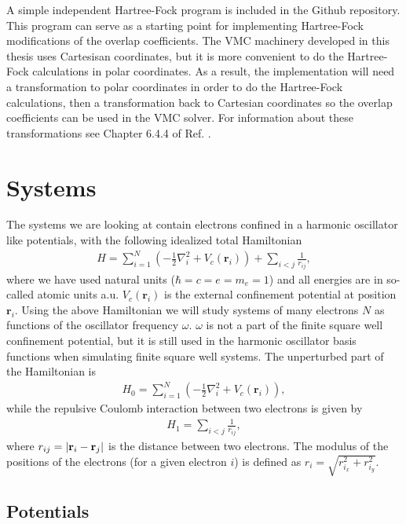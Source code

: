 \documentclass[../main.tex]{subfiles}
\begin{document}
A simple independent Hartree-Fock program is included in the Github repository\cite{github}. This program can serve as a starting point for implementing Hartree-Fock modifications of the overlap coefficients. The VMC machinery developed in this thesis uses Cartesisan coordinates, but it is more convenient to do the Hartree-Fock calculations in polar coordinates. As a result, the implementation will need a transformation to polar coordinates in order to do the Hartree-Fock calculations, then a transformation back to Cartesian coordinates so the overlap coefficients can be used in the VMC solver. For information about these transformations see Chapter 6.4.4 of Ref. \cite{Yang}.


\chapter{Systems}\label{sec: Systems}

The systems we are looking at contain electrons confined in a harmonic oscillator like potentials, with the following idealized total Hamiltonian
\begin{align}\label{eq: finalH}
    H=\sum_{i=1}^{N} \left(  -\frac{1}{2} \nabla_i^2 + V_c(\mathbf{r}_i)  \right)+\sum_{i<j}\frac{1}{r_{ij}},
\end{align}
where we have used natural units ($\hbar=c=e=m_e=1$) and all energies are in so-called atomic units a.u. $V_c(\mathbf{r}_i)$ is the external confinement potential at position $\mathbf{r}_i$. Using the above Hamiltonian we will study systems of many electrons $N$ as functions of the oscillator frequency  $\omega$. $\omega$ is not a part of the finite square well confinement potential, but it is still used in the harmonic oscillator basis functions when simulating finite square well systems. The unperturbed part of the Hamiltonian is
\begin{align}
    H_0=\sum_{i=1}^{N} \left(  -\frac{1}{2} \nabla_i^2 + V_c(\mathbf{r}_i)  \right),
\end{align}
while the repulsive Coulomb interaction between two electrons is given by
\begin{align}
    H_1=\sum_{i<j}\frac{1}{r_{ij}},
\end{align}
where $r_{ij}=\vert {\bf r}_i-{\bf r}_j\vert$ is the distance between two electrons. The modulus of the positions of the electrons (for a given electron $i$) is defined as $r_i = \sqrt{r_{i_x}^2+r_{i_y}^2}$.



\section{Potentials}
\end{document}
